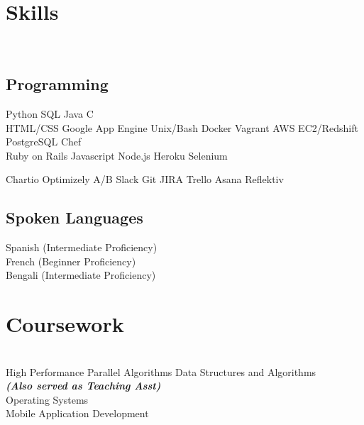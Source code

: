 \documentclass[]{deedy-resume-openfont}
\begin{document}
\begin{minipage}[t]{0.31\textwidth}

\section{Skills}
\\[1\baselineskip]
\subsection{Programming}

Python \textbullet{}  SQL  \textbullet{} Java \textbullet{} C \textbullet{}
\\[1\baselineskip]

HTML/CSS \textbullet{}
Google App Engine \textbullet{} 
Unix/Bash \textbullet{}
Docker \textbullet{} 
Vagrant \textbullet{} 
AWS EC2/Redshift \textbullet{}
PostgreSQL \textbullet{} 
Chef \textbullet{} 
\\[1\baselineskip]

Ruby on Rails \textbullet{}
Javascript \textbullet{} 
Node.js \textbullet{} 
Heroku \textbullet{} 
Selenium
\sectionsep

Chartio \textbullet{} 
Optimizely A/B \textbullet{} 
Slack \textbullet{} 
Git \textbullet{} 
JIRA \textbullet{} 
Trello \textbullet{} 
Asana \textbullet{} 
Reflektiv
\sectionsep

\subsection{Spoken Languages}
Spanish (Intermediate Proficiency) \\
French (Beginner Proficiency)\\
Bengali (Intermediate Proficiency)\\
[1\baselineskip]


\section{Coursework}
\\[1\baselineskip]
High Performance Parallel Algorithms
Data Structures and Algorithms\\
{\footnotesize \textit{\textbf{(Also served as Teaching Asst) }}} \\
Operating Systems\\
Mobile Application Development\\
\sectionsep
%
%

\end{minipage} 
\end{document}
